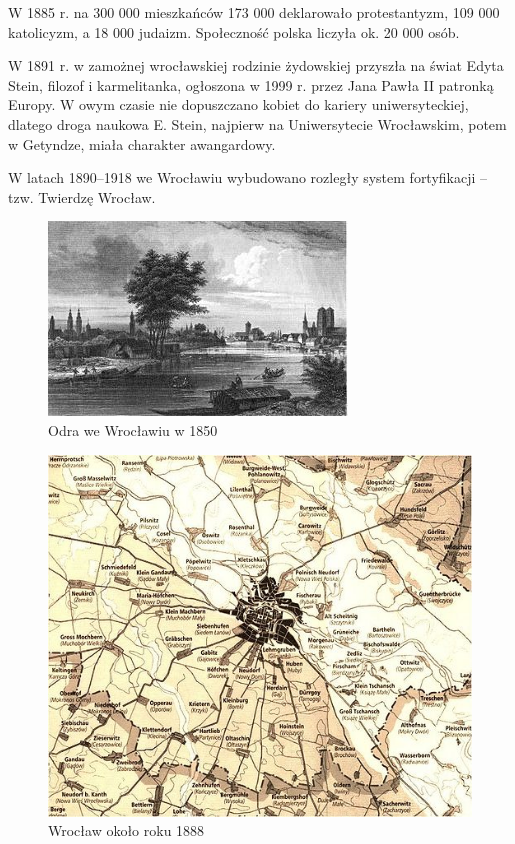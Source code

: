 \documentclass{article}
\begin{document}
\newpage
W 1885 r. na 300 000 mieszkańców 173 000 deklarowało protestantyzm, 109 000 katolicyzm, a 18 000 judaizm. Społeczność polska liczyła ok. 20 000 osób.

W 1891 r. w zamożnej wrocławskiej rodzinie żydowskiej przyszła na świat Edyta Stein, filozof i karmelitanka, ogłoszona w 1999 r. przez Jana Pawła II patronką Europy. W owym czasie nie dopuszczano kobiet do kariery uniwersyteckiej, dlatego droga naukowa E. Stein, najpierw na Uniwersytecie Wrocławskim, potem w Getyndze, miała charakter awangardowy.

W latach 1890–1918 we Wrocławiu wybudowano rozległy system fortyfikacji – tzw. Twierdzę Wrocław.

\begin{figure}[htbp!!]
\centering
\includegraphics[scale=2.0]{7.jpg}
\caption{Odra we Wrocławiu w 1850}
\label{fig:8}
\end{figure}

\begin{figure}[htbp!!]
\centering
\includegraphics[scale=0.6]{9.jpg}
\caption{Wrocław około roku 1888}
\label{fig:9}
\end{figure}
\end{document}
